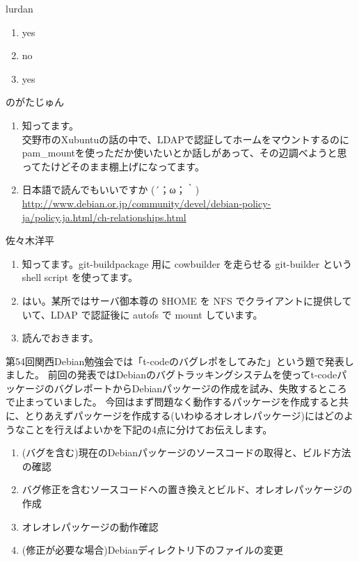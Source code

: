 \documentclass[mingoth,a4paper]{jsarticle}
\begin{document}
\begin{prework}{ lurdan }
 \begin{enumerate}
  \item yes
  \item no
  \item yes
 \end{enumerate}
\end{prework}

\begin{prework}{ のがたじゅん }
 \begin{enumerate}
  \item 知ってます。\\
        交野市のXubuntuの話の中で、LDAPで認証してホームをマウントするのにpam\_mountを使っただか使いたいとか話しがあって、その辺調べようと思ってたけどそのまま棚上げになってます。
  \item 日本語で読んでもいいですか (´；ω；｀) \\
       \url{http://www.debian.or.jp/community/devel/debian-policy-ja/policy.ja.html/ch-relationships.html}
 \end{enumerate}
\end{prework}

\begin{prework}{ 佐々木洋平 }
 \begin{enumerate}
  \item 知ってます。git-buildpackage 用に cowbuilder を走らせる git-builder という shell script を使ってます。
  \item はい。某所ではサーバ御本尊の \$HOME を NFS でクライアントに提供していて、LDAP で認証後に autofs で mount しています。
  \item 読んでおきます。
 \end{enumerate}
\end{prework}

\clearpage


\clearpage
{}

第54回関西Debian勉強会では「t-codeのバグレポをしてみた」という題で発表しました。
前回の発表ではDebianのバグトラッキングシステムを使ってt-codeパッケージのバグレポートからDebianパッケージの作成を試み、失敗するところで止まっていました。
今回はまず問題なく動作するパッケージを作成すると共に、とりあえずパッケージを作成する(いわゆるオレオレパッケージ)にはどのようなことを行えばよいかを下記の4点に分けてお伝えします。

\begin{enumerate}
\item (バグを含む)現在のDebianパッケージのソースコードの取得と、ビルド方法の確認
\item バグ修正を含むソースコードへの置き換えとビルド、オレオレパッケージの作成
\item オレオレパッケージの動作確認
\item (修正が必要な場合)Debianディレクトリ下のファイルの変更
\end{enumerate}
\end{document}

